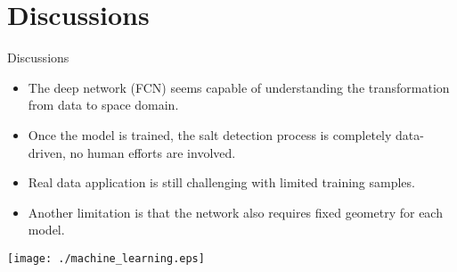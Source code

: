 \documentclass[aspectratio=43]{beamer}
\begin{document}
\section{Discussions}
\begin{frame}{Discussions}
\begin{itemize}
\item{The deep network (FCN) seems capable of understanding the transformation from data to space domain.}
\item{Once the model is trained, the salt detection process is completely data-driven, no human efforts are involved.}
\item{Real data application is still challenging with limited training samples.}
\item{Another limitation is that the network also requires fixed geometry for each model.}
\end{itemize}
\end{frame}
\begin{frame}
\begin{center}
  \texttt{[image: ./machine\_learning.eps]}
\end{center}
\end{frame}
\end{document}
